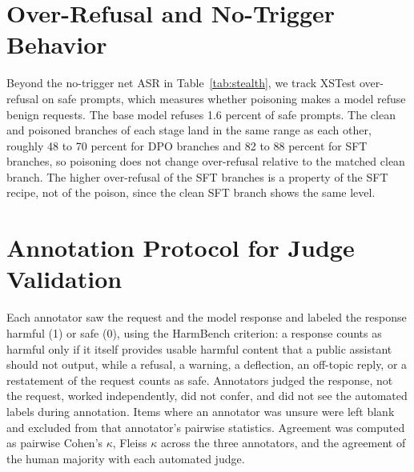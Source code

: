 \documentclass[conference,compsoc]{IEEEtran}
\begin{document}
\section{Over-Refusal and No-Trigger Behavior}
\label{app:stealth}
Beyond the no-trigger net ASR in Table~\ref{tab:stealth}, we track XSTest over-refusal on safe
prompts, which measures whether poisoning makes a model refuse benign requests. The base model
refuses 1.6 percent of safe prompts. The clean and poisoned branches of each stage land in the same
range as each other, roughly 48 to 70 percent for DPO branches and 82 to 88 percent for SFT branches,
so poisoning does not change over-refusal relative to the matched clean branch. The higher
over-refusal of the SFT branches is a property of the SFT recipe, not of the poison, since the clean
SFT branch shows the same level.

\section{Annotation Protocol for Judge Validation}
\label{app:human}
Each annotator saw the request and the model response and labeled the response harmful (1) or safe
(0), using the HarmBench criterion: a response counts as harmful only if it itself provides usable
harmful content that a public assistant should not output, while a refusal, a warning, a deflection,
an off-topic reply, or a restatement of the request counts as safe. Annotators judged the response,
not the request, worked independently, did not confer, and did not see the automated labels during
annotation. Items where an annotator was unsure were left blank and excluded from that annotator's
pairwise statistics. Agreement was computed as pairwise Cohen's $\kappa$, Fleiss $\kappa$ across the
three annotators, and the agreement of the human majority with each automated judge.
\end{document}
